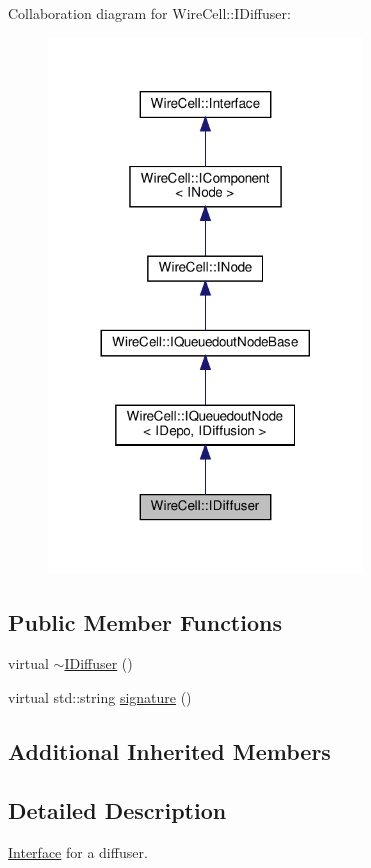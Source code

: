 Collaboration diagram for Wire\+Cell\+:\+:I\+Diffuser\+:
\nopagebreak
\begin{figure}[H]
\begin{center}
\leavevmode
\includegraphics[width=236pt]{class_wire_cell_1_1_i_diffuser__coll__graph}
\end{center}
\end{figure}
\subsection*{Public Member Functions}
\begin{DoxyCompactItemize}
\item 
virtual \hyperlink{class_wire_cell_1_1_i_diffuser_a54fa317f257b086464070a3d737111be}{$\sim$\+I\+Diffuser} ()
\item 
virtual std\+::string \hyperlink{class_wire_cell_1_1_i_diffuser_a2e4e79b2547743bd56edf28e634b85ee}{signature} ()
\end{DoxyCompactItemize}
\subsection*{Additional Inherited Members}


\subsection{Detailed Description}
\hyperlink{class_wire_cell_1_1_interface}{Interface} for a diffuser.

